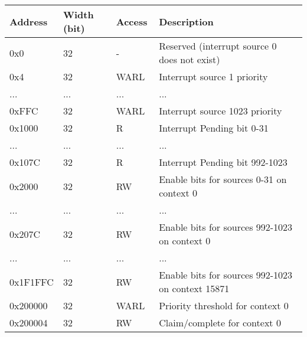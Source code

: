 \begin{table}[!htb]
    \centering
    \begin{tabular}{|l|l|l|l|}
    \hline
    \textbf{Address} & \textbf{Width (bit)} & \textbf{Access}    & \textbf{Description}                              \\ \hline
    0x0              & 32                   & -                  & Reserved (interrupt source 0 does not exist)      \\ \hline
    0x4              & 32                   & WARL~\footnotemark & Interrupt source 1 priority                       \\ \hline
    ...              & ...                  & ...                & ...                                               \\ \hline
    0xFFC            & 32                   & WARL               & Interrupt source 1023 priority                    \\ \hline
    0x1000           & 32                   & R                  & Interrupt Pending bit 0-31                        \\ \hline
    ...              & ...                  & ...                & ...                                               \\ \hline
    0x107C           & 32                   & R                  & Interrupt Pending bit 992-1023                    \\ \hline
    0x2000           & 32                   & RW                 & Enable bits for sources 0-31 on context 0         \\ \hline
    ...              & ...                  & ...                & ...                                               \\ \hline
    0x207C           & 32                   & RW                 & Enable bits for sources 992-1023 on context 0     \\ \hline
    ...              & ...                  & ...                & ...                                               \\ \hline
    0x1F1FFC         & 32                   & RW                 & Enable bits for sources 992-1023 on context 15871 \\ \hline
    0x200000         & 32                   & WARL               & Priority threshold for context 0                  \\ \hline
    0x200004         & 32                   & RW                 & Claim/complete for context 0                      \\ \hline

\end{tabular}
\end{table}
